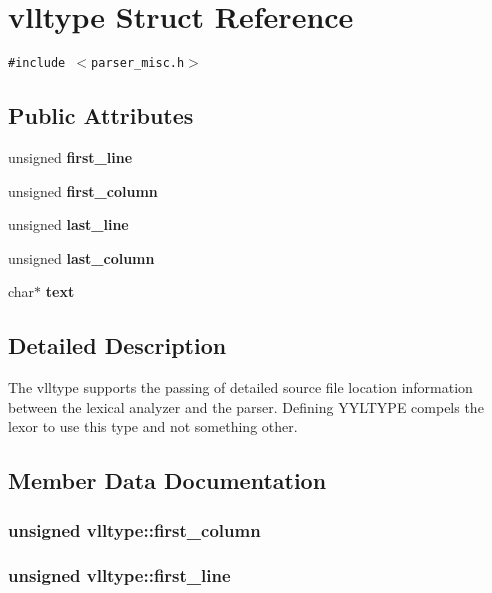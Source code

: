 \section{vlltype  Struct Reference}
\label{structvlltype}
{\tt \#include $<$parser\_\-misc.h$>$}

\subsection*{Public Attributes}
\begin{CompactItemize}
\item 
unsigned {\bf first\_\-line}
\item 
unsigned {\bf first\_\-column}
\item 
unsigned {\bf last\_\-line}
\item 
unsigned {\bf last\_\-column}
\item 
char$\ast$ {\bf text}
\end{CompactItemize}


\subsection{Detailed Description}
The vlltype supports the passing of detailed source file location information between the lexical analyzer and the parser. Defining YYLTYPE compels the lexor to use this type and not something other. 



\subsection{Member Data Documentation}
\subsubsection{\setlength{\rightskip}{0pt plus 5cm}unsigned vlltype::first\_\-column}\label{structvlltype_m1}


\subsubsection{\setlength{\rightskip}{0pt plus 5cm}unsigned vlltype::first\_\-line}\label{structvlltype_m0}


